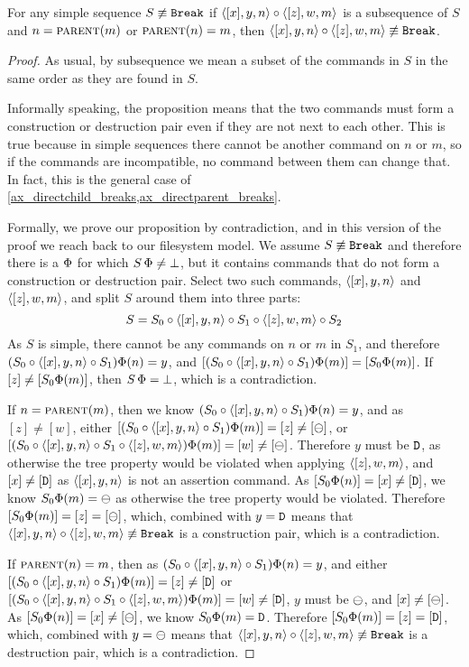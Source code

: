 \begin{mylem}\label{simple_distant_pairs}
For any simple sequence $S\not\equiv\mathtt{Break}$
if $\langle{[x],y,n}\rangle\circ\langle{[z],w,m}\rangle$ is a subsequence of $S$ and $n=\text{\normalfont\scshape{parent}}(m)$ or $\text{\normalfont\scshape{parent}}(n)=m$,
then $\langle{[x],y,n}\rangle\circ\langle{[z],w,m}\rangle\not\equiv\mathtt{Break}$.
\end{mylem}
\begin{proof}
As usual, by subsequence we mean a subset of the commands in $S$ in the same order as they are found in $S$.

Informally speaking, the proposition means that
the two commands must form a construction or destruction pair even
if they are not next to each other.
This is true because in simple sequences
there cannot be another command on $n$ or $m$,
so if the commands are incompatible, no command between them can change that.
In fact, this  is the general case
of \cref{ax_directchild_breaks,ax_directparent_breaks}.

Formally, we prove our proposition by contradiction,
and in this version of the proof we reach back to our filesystem model.
We assume $S\not\equiv\mathtt{Break}$ and therefore there is a $\Phi$ for which $S\,\Phi\neq\bot$,
but it contains commands that do not form a construction or destruction pair.
Select two such commands, $\langle{[x],y,n}\rangle$ and $\langle{[z],w,m}\rangle$,
and split $S$ around them into three parts:
\[ S = S_0 \circ \langle{[x],y,n}\rangle \circ S_1 \circ \langle{[z],w,m}\rangle \circ S_2 \]
As $S$ is simple, there cannot be any commands on $n$ or $m$ in $S_1$,
and therefore $(S_0\circ\langle{[x],y,n}\rangle\circ S_1)\Phi(n) = y$,
and $[(S_0\circ\langle{[x],y,n}\rangle\circ S_1)\Phi(m)] = [S_0\Phi(m)]$.
If $[z]\neq[S_0\Phi(m)]$, then $S\,\Phi=\bot$, which is a contradiction.

If $n=\text{\normalfont\scshape{parent}}(m)$, then 
we know $(S_0\circ\langle{[x],y,n}\rangle\circ S_1)\Phi(n) = y$, and as $[z]\neq[w]$, either
$[(S_0\circ\langle{[x],y,n}\rangle\circ S_1)\Phi(m)]=[z]\neq[\ominus]$,
or $[(S_0\circ\langle{[x],y,n}\rangle\circ S_1\circ\langle{[z],w,m}\rangle)\Phi(m)]=[w]\neq[\ominus]$.
Therefore $y$ must be $\mathtt{D}$, as otherwise the tree property would be violated
when applying $\langle{[z],w,m}\rangle$,
and $[x]\neq[\mathtt{D}]$ as $\langle{[x],y,n}\rangle$ is not an assertion command.
As $[S_0\Phi(n)]=[x]\neq[\mathtt{D}]$, we know
$S_0\Phi(m)=\ominus$ as otherwise the tree property would be violated.
Therefore $[S_0\Phi(m)]=[z]=[\ominus]$, which, combined with $y=\mathtt{D}$
means that $\langle{[x],y,n}\rangle\circ\langle{[z],w,m}\rangle\not\equiv\mathtt{Break}$ is a construction pair, which is a contradiction.

If $\text{\normalfont\scshape{parent}}(n)=m$, then 
as $(S_0\circ\langle{[x],y,n}\rangle\circ S_1)\Phi(n) = y$, and either
$[(S_0\circ\langle{[x],y,n}\rangle\circ S_1)\Phi(m)]=[z]\neq[\mathtt{D}]$
or $[(S_0\circ\langle{[x],y,n}\rangle\circ S_1\circ\langle{[z],w,m}\rangle)\Phi(m)]=[w]\neq[\mathtt{D}]$,
$y$ must be $\ominus$, and $[x]\neq[\ominus]$.
As $[S_0\Phi(n)]=[x]\neq[\ominus]$, we know $S_0\Phi(m)=\mathtt{D}$.
Therefore $[S_0\Phi(m)]=[z]=[\mathtt{D}]$, which, combined with $y=\ominus$
means that $\langle{[x],y,n}\rangle\circ\langle{[z],w,m}\rangle\not\equiv\mathtt{Break}$ is a destruction pair, which is a contradiction.
\end{proof}


